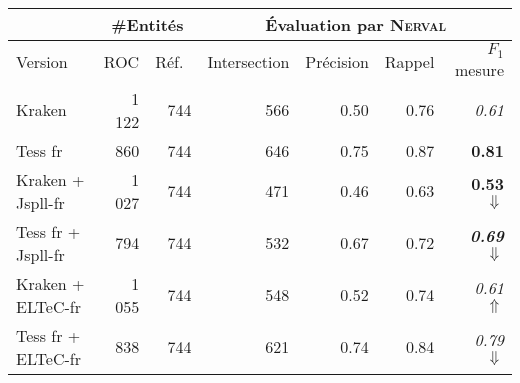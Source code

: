 \scriptsize{
\begin{tabular}{|l|r|r|r|r|r|r|}
\hline
 & \multicolumn{2}{c|}{{\#Entités}} & \multicolumn{4}{c|}{\'Evaluation par \textsc{Nerval}}\\
 \hline
Version & ROC & Réf.\ &Intersection& Précision & Rappel & $F_1$ mesure\\

 \hline
Kraken  & 1 122 & 744 &  566  & 0.50    &0.76  &\textit{0.61}  \\
\hline
Tess fr  & 860 &744  &646     & 0.75     & 0.87  & \textbf{0.81}  \\
\hline
\hline
Kraken + Jspll-fr & 1 027  &744  &471     & 0.46     & 0.63  &\textbf{ 0.53} $\Downarrow$  \\
\hline
Tess fr + Jspll-fr & 794&  744& 532     & 0.67 & 0.72 & \textit{\textbf{0.69}} $\Downarrow$  \\
\hline
\hline
Kraken + ELTeC-fr &1 055 & 744 &548 & 0.52     &0.74  & \textit{0.61} $\Uparrow$ \\
\hline
Tess fr + ELTeC-fr &838 & 744 & 621  & 0.74     &0.84  & \textit{0.79} $\Downarrow$ \\
\hline
\end{tabular}}